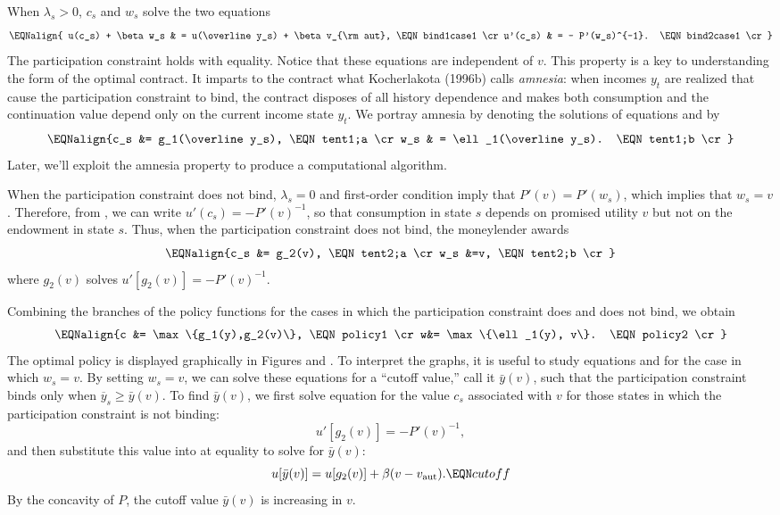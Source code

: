 When $\lambda_s > 0$, $c_s$ and $w_s$ solve
the two equations
$$ \EQNalign{ u(c_s) + \beta w_s & = u(\overline y_s) + \beta v_{\rm aut}, \EQN bind1case1 \cr
              u'(c_s) & = - P'(w_s)^{-1}. \EQN bind2case1 \cr }$$
The participation constraint holds with equality.
Notice that these equations are independent of $v$.  This property
is a key to understanding the form of the optimal contract.
It imparts to the contract what Kocherlakota (1996b)  calls
{\it amnesia\/}:  when incomes $y_t$ are realized that
%
cause the participation constraint to bind, the contract disposes
of all history dependence and makes both consumption and the
continuation value depend only on the current income state $y_t$.
We portray amnesia by   denoting the solutions of equations
 and  by
$$\EQNalign{c_s &= g_1(\overline y_s), \EQN tent1;a \cr
            w_s & = \ell_1(\overline y_s). \EQN tent1;b \cr} $$
Later, we'll exploit the amnesia property to produce a computational
algorithm.

\medskip
{}
\smallskip

\noindent
  When the participation constraint does not bind, $\lambda_s =0$
and first-order condition  imply that
$P'(v) =  P'(w_s)$, which implies that $w_s = v$. Therefore, from ,
 we can write $u'(c_s) = -P'(v)^{-1}$, so that consumption
in state $s$ depends
on promised utility $v$ but not on the endowment in state $s$.  Thus,
when the participation constraint does not bind, the moneylender
awards
$$\EQNalign{c_s &= g_2(v),  \EQN tent2;a \cr
            w_s &=v,       \EQN tent2;b \cr} $$
where
$g_2(v)$ solves $u'[g_2(v)] = - P'(v)^{-1}$.

\newpage
{}
\smallskip
\noindent
 Combining the branches of the policy functions for the
cases in which the participation constraint does and does
not bind, we obtain
$$\EQNalign{c &= \max\{g_1(y),g_2(v)\},  \EQN policy1 \cr
            w&= \max\{\ell_1(y), v\}.  \EQN policy2 \cr }$$
The  optimal policy is displayed graphically
in Figures  and .
  To interpret the graphs,
   it is useful to study equations  and 
for the case in which $w_s =v$.  By setting $w_s =v$, we can solve
these equations for a ``cutoff value,'' call it $\bar y(v)$, such that
the participation constraint binds  only when $\overline y_s \geq \bar y(v)$.
To find $\bar y(v)$, we first solve equation  for
the value $c_s$ associated with $v$ for those states in which
the participation constraint is not binding:
$$ u'[g_2(v)] = - P'(v)^{-1},$$
and then substitute  this value into  at equality
to solve for $\bar y(v)$:
$$ u[\bar y(v)]= u[g_2(v)] + \beta (v - v_{\rm aut}).\EQN cutoff $$
By the concavity of $P$, the cutoff value $\bar y(v)$ is
increasing in $v$.

